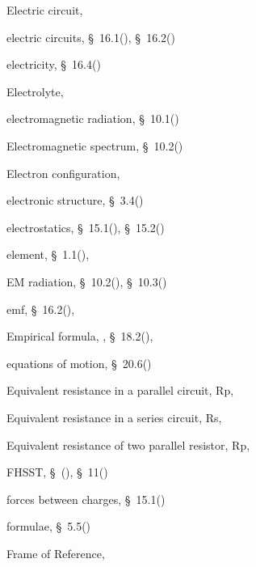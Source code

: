 \begin{multicols}{2}
{\begin{description}
	  Electric circuit,  \pageref{id2477990}
	  \item[] \noindent\raggedright electric circuits,  \S~16.1(\pageref{m38771}),  \S~16.2(\pageref{m38772})
	  \item[] \noindent\raggedright electricity,  \S~16.4(\pageref{m38776})
	  \item[] \noindent\raggedright Electrolyte,  \pageref{id2491564}
	  \item[] \noindent\raggedright electromagnetic radiation,  \S~10.1(\pageref{m38777})
	  \item[] \noindent\raggedright Electromagnetic spectrum,  \S~10.2(\pageref{m38778})
	  \item[] \noindent\raggedright Electron configuration,  \pageref{id2420737}
	  \item[] \noindent\raggedright electronic structure,  \S~3.4(\pageref{m38741})
	  \item[] \noindent\raggedright electrostatics,  \S~15.1(\pageref{m38780}),  \S~15.2(\pageref{m38781})
	  \item[] \noindent\raggedright element,  \S~1.1(\pageref{m38708}),  \pageref{id2406278}
	  \item[] \noindent\raggedright EM radiation,  \S~10.2(\pageref{m38778}),  \S~10.3(\pageref{m38779})
	  \item[] \noindent\raggedright emf,  \S~16.2(\pageref{m38772}),  \pageref{id2479864}
	  \item[] \noindent\raggedright Empirical formula,  \pageref{id2456770},  \S~18.2(\pageref{m38712}),  \pageref{id2501853}
	  \item[] \noindent\raggedright equations of motion,  \S~20.6(\pageref{m38796})
	  \item[] \noindent\raggedright Equivalent resistance in a parallel circuit, Rp,  \pageref{id2487427}
	  \item[] \noindent\raggedright Equivalent resistance in a series circuit, Rs,  \pageref{id2485652}
	  \item[] \noindent\raggedright Equivalent resistance of two parallel resistor, Rp,  \pageref{id2487246}
	  \vspace{.3cm}
	  \item[{\large \bfseries F}]\noindent\raggedright
	  FHSST,  \S~(\pageref{m30853}),  \S~11(\pageref{m38120})
	  \item[] \noindent\raggedright forces between charges,  \S~15.1(\pageref{m38780})
	  \item[] \noindent\raggedright formulae,  \S~5.5(\pageref{m38689})
	  \item[] \noindent\raggedright Frame of Reference,  \pageref{id2526298}

\end{description}}
\end{multicols}

